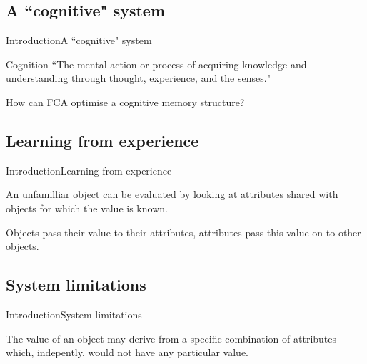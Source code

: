 \subsection{A ``cognitive" system}
\begin{frame}{Introduction}{A ``cognitive" system}

\begin{exampleblock}{Cognition}
{
  \large ``The mental action or process of acquiring knowledge and 
  understanding through thought, experience, and the senses."
}
\vskip2mm
\hspace*{}
\end{exampleblock}


How can FCA  optimise a cognitive memory  structure?


\end{frame}

\subsection{Learning from experience}
\begin{frame}{Introduction}{Learning from experience}

An unfamilliar object can be evaluated by looking at attributes shared with 
objects for which the value is known.

Objects pass their value to their attributes, attributes pass this value on to 
other objects.

\end{frame}

\subsection{System limitations}
\begin{frame}{Introduction}{System limitations}

The value of an object may derive from a specific combination of attributes 
which, indepently, would not have any particular value.

\end{frame}

